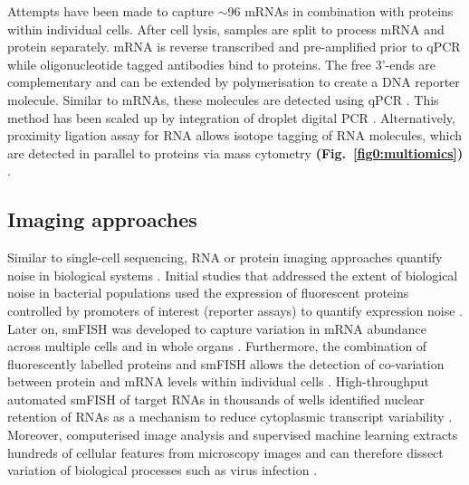 Attempts have been made to capture $\sim$96 mRNAs in combination with proteins within individual cells. After cell lysis, samples are split to process mRNA and protein separately. mRNA is reverse transcribed and pre-amplified prior to \gls{qPCR} while oligonucleotide tagged antibodies bind to proteins. The free 3’-ends are complementary and can be extended by polymerisation to create a DNA reporter molecule. Similar to mRNAs, these molecules are detected using qPCR \citep{Darmanis2016}. This method has been scaled up by integration of droplet digital PCR \citep{Albayrak2016}. Alternatively, proximity ligation assay for RNA allows isotope tagging of RNA molecules, which are detected in parallel to proteins via mass cytometry \textbf{(Fig.~\ref{fig0:multiomics})} \citep{Frei2016}.

\subsection{Imaging approaches}

Similar to single-cell sequencing, RNA or protein imaging approaches quantify noise in biological systems \citep{Harton2017a}. Initial studies that addressed the extent of biological noise in bacterial populations used the expression of fluorescent proteins controlled by promoters of interest (reporter assays) to quantify expression noise \citep{Elowitz2002, Blake2003}. Later on, \gls{smFISH} was developed to capture variation in mRNA abundance across multiple cells \citep{Fang2013a, Lyubimova2013, Sanchez2013} and in whole organs \citep{Yang2014b}. Furthermore, the combination of fluorescently labelled proteins and smFISH allows the detection of co-variation between protein and mRNA levels within individual cells \citep{Taniguchi2011}. High-throughput automated smFISH of target RNAs in thousands of wells \citep{Battich2013} identified nuclear retention of RNAs as a mechanism to reduce cytoplasmic transcript variability \citep{Battich2015a}. Moreover, computerised image analysis and supervised machine learning extracts hundreds of cellular features from microscopy images and can therefore dissect variation of biological processes such as virus infection \citep{Snijder2009}.\\

